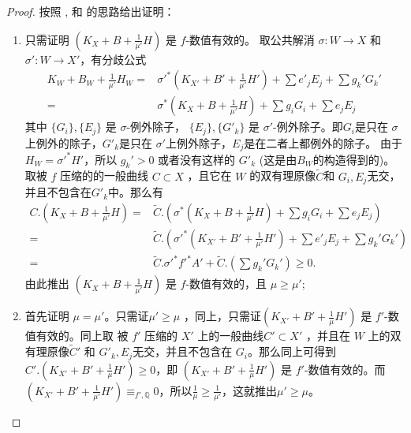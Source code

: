 \begin{proof}
  按照 \citet[Claim 13.20]{haconMinimalModelProgram2012}, \citet[Theorem 5.1]{liuSarkisovProgramGeneralized2021} 和 \citet[Theorem 4.2]{cortiFactoringBirationalMaps}的思路给出证明：
  \begin{enumerate}
    \item 只需证明 $ (K_X+B+\frac{1}{\mu'}H) $ 是 $ f $-数值有效的。 取公共解消 $\sigma:W\to X$ 和 $\sigma':W\to X'$，有分歧公式
          \[ \begin{aligned}
              K_W+B_W+\frac{1}{\mu'}H_W= & \sigma'^*(K_{X'}+B'+\frac{1}{\mu'}H')+\sum e'_jE_j+ \sum g_k'G_k' \\
              =                          & \sigma^*(K_{X}+B+\frac{1}{\mu'}H)+\sum g_iG_i+\sum e_jE_j
            \end{aligned} \]
          其中 $ \{G_i\}, \{E_j\} $ 是 $ \sigma $-例外除子，  $ \{E_j\}, \{G'_k\} $ 是 $ \sigma' $-例外除子。即$ G_{i}$是只在 $\sigma$上例外的除子，$ G'_{k}$是只在 $\sigma'$上例外除子，$E_{j}$是在二者上都例外的除子。 由于  $H_W=\sigma'^*H' $，所以 $ g_k'>0 $ 或者没有这样的 $ G'_k $ (这是由$B_{W}$的构造得到的)。取被 $f$ 压缩的的一般曲线 $ C\subset X $ ，且它在 $W$ 的双有理原像$ \tilde{C} $和 $ G_i, E_j $无交，并且不包含在$ G'_k $中。那么有
          \[ \begin{aligned}
              C.\left(K_X+B+\frac{1}{\mu'}H\right)= & \tilde{C}.\left(\sigma^*\left(K_X+B+\frac{1}{\mu'}H\right)+\sum g_iG_i+\sum e_jE_j\right)           \\
              =                                     & \tilde{C}.\left(\sigma'^*\left(K_{X'}+B'+\frac{1}{\mu'}H'\right)+\sum e'_jE_j+ \sum g_k'G_k'\right) \\
              =                                     & \tilde{C}.\sigma'^*f'^*A'+\tilde{C}.\left(\sum g_k'G_k'\right) \geqslant0 .
            \end{aligned} \]
          由此推出 $ (K_X+B+\frac{1}{\mu'}H) $ 是 $ f $-数值有效的，且 $ \mu\geqslant \mu' $;
    \item 首先证明 $ \mu=\mu' $。只需证$\mu'\geqslant \mu $ ，同上，只需证$ (K_{X'}+B'+\frac{1}{\mu}H') $ 是 $ f' $-数值有效的。同上取 被 $f'$ 压缩的 $X'$ 上的一般曲线$ C' \subset X'$ ，并且在 $W$ 上的双有理原像$\tilde{C}'$ 和  $ G'_k, E_j $无交，并且不包含在 $ G_i $。那么同上可得到$C'.\left(K_{X'}+B'+\frac{1}{\mu}H'\right)\geqslant 0$，即 $ (K_{X'}+B'+\frac{1}{\mu}H') $ 是 $ f' $-数值有效的。而$ (K_{X'}+B'+\frac{1}{\mu'}H')\equiv_{f',\mathbb{Q}}0 $，所以$ \frac{1}{\mu}\geqslant \frac{1}{\mu'} $，这就推出$\mu'\geqslant \mu $。


\end{enumerate}
\end{proof}
